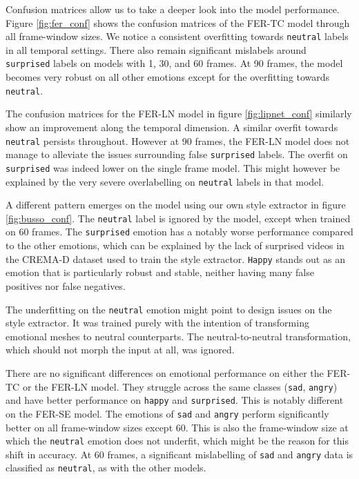 Confusion matrices allow us to take a deeper look into the model performance. Figure \ref{fig:fer_conf} shows the confusion matrices of the FER-TC model through all frame-window sizes. We notice a consistent overfitting towards \texttt{neutral} labels in all temporal settings. There also remain significant mislabels around \texttt{surprised} labels on models with 1, 30, and 60 frames. At 90 frames, the model becomes very robust on all other emotions except for the overfitting towards \texttt{neutral}.

The confusion matrices for the FER-LN model in figure \ref{fig:lipnet_conf} similarly show an improvement along the temporal dimension. A similar overfit towards \texttt{neutral} persists throughout. However at 90 frames, the FER-LN model does not manage to alleviate the issues surrounding false \texttt{surprised} labels. The overfit on \texttt{surprised} was indeed lower on the single frame model. This might however be explained by the very severe overlabelling on \texttt{neutral} labels in that model.

A different pattern emerges on the model using our own style extractor in figure \ref{fig:busso_conf}. The \texttt{neutral} label is ignored by the model, except when trained on 60 frames. The \texttt{surprised} emotion has a notably worse performance compared to the other emotions, which can be explained by the lack of surprised videos in the CREMA-D dataset used to train the style extractor. \texttt{Happy} stands out as an emotion that is particularly robust and stable, neither having many false positives nor false negatives. 

The underfitting on the \texttt{neutral} emotion might point to design issues on the style extractor. It was trained purely with the intention of transforming emotional meshes to neutral counterparts. The neutral-to-neutral transformation, which should not morph the input at all, was ignored.

There are no significant differences on emotional performance on either the FER-TC or the FER-LN model. They struggle across the same classes (\texttt{sad}, \texttt{angry}) and have better performance on \texttt{happy} and \texttt{surprised}. This is notably different on the FER-SE model. The emotions of \texttt{sad} and \texttt{angry} perform significantly better on all frame-window sizes except 60. This is also the frame-window size at which the \texttt{neutral} emotion does not underfit, which might be the reason for this shift in accuracy. At 60 frames, a significant mislabelling of \texttt{sad} and \texttt{angry} data is classified as \texttt{neutral}, as with the other models.

